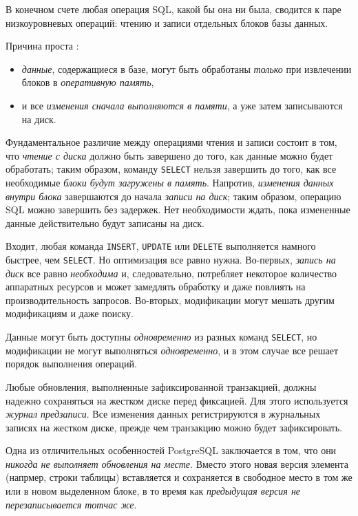 \documentclass[%
	11pt,
	a4paper,
	utf8,
		]{article}
\begin{document}
В конечном счете любая операция SQL, какой бы она ни была, сводится к паре низкоуровневых операций: чтению и записи отдельных блоков базы данных.

{\color{blue}
Причина проста \cite[]{dombrovskaya:postgresql-2022}:
\begin{itemize}
	\item \emph{данные}, содержащиеся в базе, могут быть обработаны \emph{только} при извлечении блоков в \emph{оперативную память},
	
	\item и все \emph{изменения сначала выполняются в памяти}, а уже затем записываются на диск.
\end{itemize}
}

Фундаментальное различие между операциями чтения и записи состоит в том, что \emph{чтение с диска} должно быть завершено до того, как данные можно будет обработать; таким образом, команду \verb|SELECT| нельзя завершить до того, как все необходимые \emph{блоки будут загружены в память}. Напротив, \emph{изменения данных внутри блока} завершаются до начала \emph{записи на диск}; таким образом, операцию SQL можно завершить без задержек. Нет необходимости ждать, пока измененные данные действительно будут {записаны на диск}.

Входит, любая команда \verb|INSERT|, \verb|UPDATE| или \verb|DELETE| выполняется намного быстрее, чем \verb|SELECT|. Но оптимизация все равно нужна. Во-первых, \emph{запись на диск} все равно \emph{необходима} и, следовательно, потребляет некоторое количество аппаратных ресурсов и может замедлять обработку и даже повлиять на производительность запросов. Во-вторых, модификации могут мешать другим модификациям и даже поиску.

Данные могут быть доступны \emph{одновременно} из разных команд \verb|SELECT|, но модификации не могут выполняться \emph{одновременно}, и в этом случае все решает порядок выполнения операций.

Любые обновления, выполненные зафиксированной транзакцией, должны надежно сохраняться на жестком диске перед фиксацией. Для этого используется \emph{журнал предзаписи}. Все изменения данных регистрируются в журнальных записях на жестком диске, прежде чем транзакцию можно будет зафиксировать.

Одна из отличительных особенностей PostgreSQL заключается в том, что они \emph{никогда не выполняет обновления на месте}. Вместо этого новая версия элемента (напрмер, строки таблицы) вставляется и сохраняется в свободное место в том же или в новом выделенном блоке, в то время как \emph{предыдущая версия не перезаписывается тотчас же}.
\end{document}
